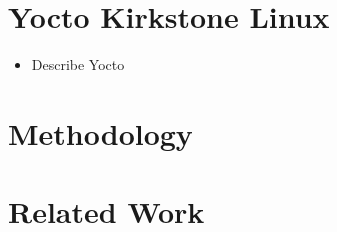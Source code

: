 \section{Yocto Kirkstone Linux}
\begin{tcolorbox}[title=TODO]
    \begin{itemize}
        \item Describe Yocto
    \end{itemize}
\end{tcolorbox}

\section{Methodology}
\section{Related Work}
